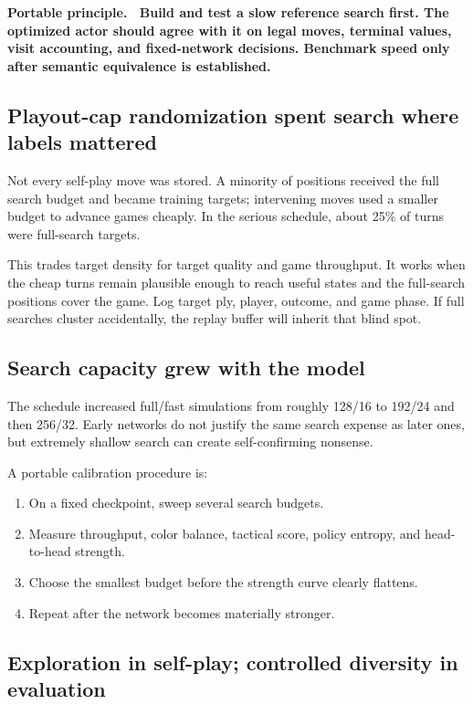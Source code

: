 \documentclass[10.5pt,letterpaper]{article}
\newcommand{\boxtitle}[1]{\sffamily\bfseries\color{deepblue}#1.\ }
\begin{document}
\begin{plainbox}
\boxtitle{Portable principle}
Build and test a slow reference search first. The optimized actor should agree
with it on legal moves, terminal values, visit accounting, and fixed-network
decisions. Benchmark speed only after semantic equivalence is established.
\end{plainbox}

\subsection{Playout-cap randomization spent search where labels mattered}

Not every self-play move was stored. A minority of positions received the full
search budget and became training targets; intervening moves used a smaller
budget to advance games cheaply. In the serious schedule, about 25\% of turns
were full-search targets.

This trades target density for target quality and game throughput. It works
when the cheap turns remain plausible enough to reach useful states and the
full-search positions cover the game. Log target ply, player, outcome, and game
phase. If full searches cluster accidentally, the replay buffer will inherit
that blind spot.

\subsection{Search capacity grew with the model}

The schedule increased full/fast simulations from roughly 128/16 to 192/24 and
then 256/32. Early networks do not justify the same search expense as later
ones, but extremely shallow search can create self-confirming nonsense.

A portable calibration procedure is:
\begin{enumerate}
  \item On a fixed checkpoint, sweep several search budgets.
  \item Measure throughput, color balance, tactical score, policy entropy, and
        head-to-head strength.
  \item Choose the smallest budget before the strength curve clearly flattens.
  \item Repeat after the network becomes materially stronger.
\end{enumerate}

\subsection{Exploration in self-play; controlled diversity in evaluation}
\end{document}
